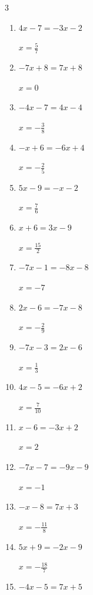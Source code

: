 \begin{multicols}{3}
\begin{enumerate}
  \item $4x-7=-3x-2$

        $\displaystyle x=\frac{5}{7}$

\columnbreak %

  \item $-7x+8=7x+8$

        $\displaystyle x=0$

  \item $-4x-7=4x-4$

        $\displaystyle x=-\frac{3}{8}$

  \item $-x+6=-6x+4$

        $\displaystyle x=-\frac{2}{5}$

  \item $5x-9=-x-2$

        $\displaystyle x=\frac{7}{6}$

  \item $x+6=3x-9$

        $\displaystyle x=\frac{15}{2}$

  \item $-7x-1=-8x-8$

        $\displaystyle x=-7$

  \item $2x-6=-7x-8$

        $\displaystyle x=-\frac{2}{9}$

  \item $-7x-3=2x-6$

        $\displaystyle x=\frac{1}{3}$

  \item $4x-5=-6x+2$

        $\displaystyle x=\frac{7}{10}$

  \item $x-6=-3x+2$

        $\displaystyle x=2$

  \item $-7x-7=-9x-9$

        $\displaystyle x=-1$

  \item $-x-8=7x+3$

        $\displaystyle x=-\frac{11}{8}$

  \item $5x+9=-2x-9$

        $\displaystyle x=-\frac{18}{7}$

  \item $-4x-5=7x+5$


\end{enumerate}
\end{multicols}
